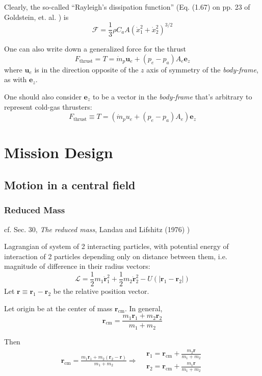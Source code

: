 \documentclass[10pt]{amsart}
\begin{document}
\begin{multicols*}{2}
Clearly, the so-called ``Rayleigh's dissipation function'' (Eq. (1.67) on pp. 23 of Goldstein, et. al. \cite{HGoldsteinCPooleJSafko2001}) is 
\[
\mathcal{F} = \frac{1}{3} \rho C_a A (\dot{x}_1^2 + \dot{x}_2^2)^{3/2}
\]

One can also write down a generalized force for the thrust
\[
F_{\text{thrust}} = T = \dot{m}_p \mathbf{u}_{e} + (p_e- p_a) A_e \mathbf{e}_z 
\]
where $\mathbf{u}_e$ is in the direction opposite of the $z$ axis of symmetry of the \emph{body-frame}, as with $\mathbf{e}_z$.  

One should also consider $\mathbf{e}_z$ to be a vector in the \emph{body-frame} that's arbitrary to represent cold-gas thrusters:
\[
F_{\text{thrust}} \equiv T = (\dot{m}_p u_e + (p_e- p_a) A_e) \mathbf{e}_z
\]

\section{Mission Design}

\subsection{Motion in a central field}

\subsubsection{Reduced Mass}

cf. Sec. 30, \emph{The reduced mass}, Landau and Lifshitz (1976) \cite{LLandauELifshitz1976})

Lagrangian of system of 2 interacting particles, with potential energy of interaction of 2 particles depending only on distance between them, i.e. magnitude of difference in their radius vectors:
\begin{equation}
\mathcal{L} = \frac{1}{2} m_1 \dot{ \mathbf{r}}_1^2 + \frac{1}{2} m_2 \dot{\mathbf{r}}_2^2 - U( | \mathbf{r}_1 - \mathbf{r}_2 |)
\end{equation}
Let $\mathbf{r} \equiv \mathbf{r}_1 - \mathbf{r}_2$ be the relative position vector. 

Let origin be at the center of mass $\mathbf{r}_{\text{cm}}$. In general, 
\begin{equation}
\mathbf{r}_{\text{cm}} = \frac{m_1 \mathbf{r}_1 + m_2 \mathbf{r}_2 }{ m_1 + m_2 }
\end{equation}

Then
\[
\begin{gathered}
	\mathbf{r}_{\text{cm}} = \frac{m_1 \mathbf{r}_1 + m_2(\mathbf{r}_2 - \mathbf{r}) }{ m_1 + m_2} \Longrightarrow \begin{aligned} 	
	& \mathbf{r}_1 = \mathbf{r}_{\text{cm}} + \frac{m_2 \mathbf{r}}{ m_1 + m_2 } \\
	& \mathbf{r}_2 = \mathbf{r}_{\text{cm}} + \frac{m_1 \mathbf{r}}{ m_1 + m_2 } 
	\end{aligned} 
\end{gathered}
\]


\end{multicols*}
\end{document}
